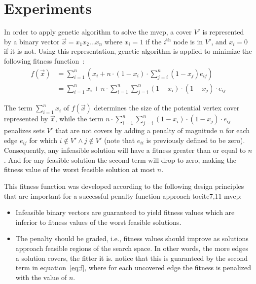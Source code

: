 \documentclass[12pt]{article}
\begin{document}
\section{Experiments}
\label{sec:GAmvcp}
In order to apply genetic algorithm to solve the mvcp, a cover $V'$ is represented
by a binary vector $\vec{x} = x_1x_2 \dots x_n$ where $x_i = 1$ if
the $i^{\text{th}}$ node is in $V'$, and $x_i = 0$ if it is not.
Using this representation, genetic algorithm is applied to minimize the following
fitness function~\cite{mvcp-back}:
\begin{equation}
\label{eq:f}
\begin{split}
f(\vec{x})	&= \sum_{i=1}^{n} \left( x_i+n \cdot (1-x_i) \cdot
			   \sum_{j=i}^{n} (1-x_j) e_{ij} \right) \\
 			&= \sum_{i=1}^{n} x_i + n \cdot \sum_{i=1}^{n}
			   \sum_{j=i}^{n} (1-x_i) \cdot (1-x_j) \cdot e_{ij}
\end{split}
\end{equation}

The term $ \sum_{i=1}^{n} x_i $ of $ f(\vec{x}) $ determines the size of the
potential vertex cover represented by $\vec{x}$, while the term
$ n \cdot \sum_{i=1}^{n} \sum_{j=i}^{n} (1-x_i) \cdot (1-x_j) \cdot e_{ij} $
penalizes sets $V'$ that
are not covers by adding a penalty of magnitude $n$ for
each edge $e_{ij}$ for which $i \notin V' \wedge j \notin V'$
(note that $e_{ii}$ is previously defined to be zero).
Consequently, any infeasible solution will have a fitness greater than
or equal to $n$. And for any feasible solution the second term will
drop to zero, making the fitness value of the worst feasible solution at most $n$.

This fitness function was developed according to the
following design principles that are important for a
successful penalty function approach tocite{7,11 mvcp}:
\begin{itemize}
\vspace{-4mm}

\item Infeasible binary vectors are guaranteed to yield fitness
values which are inferior to fitness values of
the worst feasible solutions.

\item The penalty should be graded, i.e., fitness values
should improve as solutions approach feasible regions
of the search space. In other words, the more edges a solution
covers, the fitter it is. notice that this is guaranteed by the
second term in equation~\ref{eq:f}, where for each uncovered edge
the fitness is penalized with the value of $n$.
\end{itemize}
\end{document}
